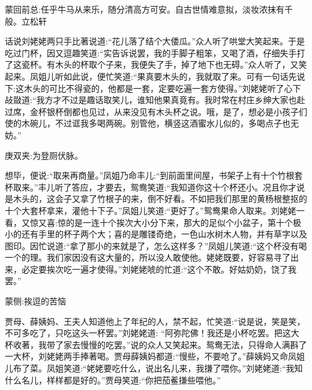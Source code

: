 
\begin{parag}
    \begin{note}蒙回前总:任乎牛马从来乐，随分清高方可安。自古世情难意拟，淡妆浓抹有千般。立松轩\end{note}
\end{parag}


\begin{parag}
    话说刘姥姥两只手比著说道:“花儿落了结个大倭瓜。”众人听了哄堂大笑起来。于是吃过门杯，因又逗趣笑道:“实告诉说罢，我的手脚子粗笨，又喝了酒，仔细失手打了这瓷杯。有木头的杯取个子来，我便失了手，掉了地下也无碍。”众人听了，又笑起来。凤姐儿听如此说，便忙笑道:“果真要木头的，我就取了来。可有一句话先说下:这木头的可比不得瓷的，他都是一套，定要吃遍一套方使得。”刘姥姥听了心下敁敠道:“我方才不过是趣话取笑儿，谁知他果真竟有。我时常在村庄乡绅大家也赴过席，金杯银杯倒都也见过，从来没见有木头杯之说。哦，是了，想必是小孩子们使的木碗儿，不过诓我多喝两碗。别管他，横竖这酒蜜水儿似的，多喝点子也无妨。”\begin{note}庚双夹:为登厕伏脉。\end{note}想毕，便说:“取来再商量。”凤姐乃命丰儿:“到前面里间屋，书架子上有十个竹根套杯取来。”丰儿听了答应，才要去，鸳鸯笑道:“我知道你这十个杯还小。况且你才说是木头的，这会子又拿了竹根子的来，倒不好看。不如把我们那里的黄杨根整抠的十个大套杯拿来，灌他十下子。”凤姐儿笑道:“更好了。”鸳鸯果命人取来。刘姥姥一看，又惊又喜:惊的是一连十个挨次大小分下来，那大的足似个小盆子，第十个极小的还有手里的杯子两个大；喜的是雕镂奇绝，一色山水树木人物，并有草字以及图印。因忙说道:“拿了那小的来就是了，怎么这样多？”凤姐儿笑道:“这个杯没有喝一个的理。我们家因没有这大量的，所以没人敢使他。姥姥既要，好容易寻了出来，必定要挨次吃一遍才使得。”刘姥姥唬的忙道:“这个不敢。好姑奶奶，饶了我罢。”\begin{note}蒙侧:挨逗的苦恼\end{note}贾母、薛姨妈、王夫人知道他上了年纪的人，禁不起，忙笑道:“说是说，笑是笑，不可多吃了，只吃这头一杯罢。”刘姥姥道: “阿弥陀佛！我还是小杯吃罢。把这大杯收著，我带了家去慢慢的吃罢。”说的众人又笑起来。鸳鸯无法，只得命人满斟了一大杯，刘姥姥两手捧著喝。贾母薛姨妈都道:“慢些，不要呛了。”薛姨妈又命凤姐儿布了菜。凤姐笑道:“姥姥要吃什么，说出名儿来，我搛了喂你。”刘姥姥道:“我知什么名儿，样样都是好的。”贾母笑道:“你把茄鲝搛些喂他。” 
\end{parag}
